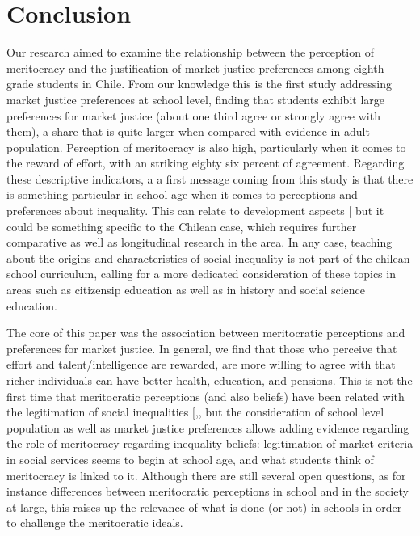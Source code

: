 \documentclass[
  12pt,
  letterpaper,
]{article}
\begin{document}
\section{Conclusion}\label{conclusion}

Our research aimed to examine the relationship between the perception of
meritocracy and the justification of market justice preferences among
eighth-grade students in Chile. From our knowledge this is the first
study addressing market justice preferences at school level, finding
that students exhibit large preferences for market justice (about one
third agree or strongly agree with them), a share that is quite larger
when compared with evidence in adult population. Perception of
meritocracy is also high, particularly when it comes to the reward of
effort, with an striking eighty six percent of agreement. Regarding
these descriptive indicators, a a first message coming from this study
is that there is something particular in school-age when it comes to
perceptions and preferences about inequality. This can relate to
development aspects {[}\citeproc{ref-rizzo_children_2020}{77}{]} but it
could be something specific to the Chilean case, which requires further
comparative as well as longitudinal research in the area. In any case,
teaching about the origins and characteristics of social inequality is
not part of the chilean school curriculum, calling for a more dedicated
consideration of these topics in areas such as citizensip education as
well as in history and social science education.

The core of this paper was the association between meritocratic
perceptions and preferences for market justice. In general, we find that
those who perceive that effort and talent/intelligence are rewarded, are
more willing to agree with that richer individuals can have better
health, education, and pensions. This is not the first time that
meritocratic perceptions (and also beliefs) have been related with the
legitimation of social inequalities
{[},\citeproc{ref-darnon_where_2018}{63}{]},
but the consideration of school level population as well as market
justice preferences allows adding evidence regarding the role of
meritocracy regarding inequality beliefs: legitimation of market
criteria in social services seems to begin at school age, and what
students think of meritocracy is linked to it. Although there are still
several open questions, as for instance differences between meritocratic
perceptions in school and in the society at large, this raises up the
relevance of what is done (or not) in schools in order to challenge the
meritocratic ideals.
\end{document}
